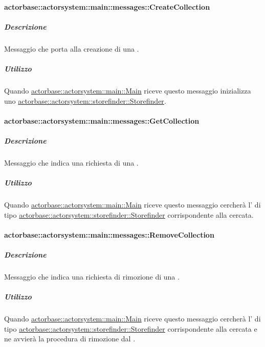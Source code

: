 \documentclass{scalatekids-article}
\begin{document}
\paragraph{actorbase::actorsystem::main::messages::CreateCollection}
\label{sec:actorbase::actorsystem::main::messages::CreateCollection}

\subparagraph{Descrizione}

Messaggio che porta alla creazione di una .

\subparagraph{Utilizzo}

Quando \hyperref[sec:actorbase::actorsystem::main::Main]{actorbase::actorsystem::main::Main}
riceve questo messaggio inizializza uno \hyperref[sec:actorbase::actorsystem::storefinder::Storefinder]{actorbase::actorsystem::\allowbreak{}storefinder::\allowbreak{}Storefinder}.

\paragraph{actorbase::actorsystem::main::messages::GetCollection}
\label{sec:actorbase::actorsystem::main::messages::GetCollection}

\subparagraph{Descrizione}

Messaggio che indica una richiesta di una .

\subparagraph{Utilizzo}

Quando \hyperref[sec:actorbase::actorsystem::main::Main]{actorbase::actorsystem::main::Main}
riceve questo messaggio cercherà l' di tipo
\hyperref[sec:actorbase::actorsystem::storefinder::Storefinder]{actorbase::actorsystem::\allowbreak{}storefinder::\allowbreak{}Storefinder}
corrispondente alla  cercata.

\paragraph{actorbase::actorsystem::main::messages::RemoveCollection}
\label{sec:actorbase::actorsystem::main::messages::RemoveCollection}

\subparagraph{Descrizione}

Messaggio che indica una richiesta di rimozione di una .

\subparagraph{Utilizzo}

Quando \hyperref[sec:actorbase::actorsystem::main::Main]{actorbase::actorsystem::main::Main}
riceve questo messaggio cercherà l' di tipo
\hyperref[sec:actorbase::actorsystem::storefinder::Storefinder]{actorbase::actorsystem::\allowbreak{}storefinder::\allowbreak{}Storefinder}
corrispondente alla  cercata e ne avvierà
la procedura di rimozione dal .
\end{document}
